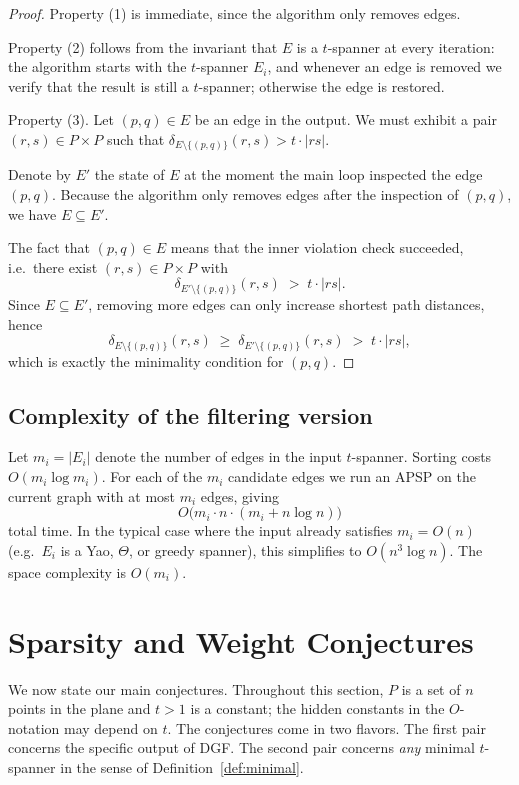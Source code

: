 \documentclass{article}
\begin{document}
\begin{proof}
Property (1) is immediate, since the algorithm only removes edges.

Property (2) follows from the invariant that $E$ is a $t$-spanner at
every iteration: the algorithm starts with the $t$-spanner $E_i$, and
whenever an edge is removed we verify that the result is still a
$t$-spanner; otherwise the edge is restored.

Property (3). Let $(p,q)\in E$ be an edge in the output. We must
exhibit a pair $(r,s)\in P\times P$ such that
$\delta_{E\setminus\{(p,q)\}}(r,s)>t\cdot|rs|$.

Denote by $E'$ the state of $E$ at the moment the main loop inspected
the edge $(p,q)$. Because the algorithm only removes edges after the
inspection of $(p,q)$, we have $E\subseteq E'$.

The fact that $(p,q)\in E$ means that the inner violation check
succeeded, i.e.\ there exist $(r,s)\in P\times P$ with
\[
   \delta_{E'\setminus\{(p,q)\}}(r,s) \;>\; t\cdot|rs|.
\]
Since $E\subseteq E'$, removing more edges can only increase shortest
path distances, hence
\[
   \delta_{E\setminus\{(p,q)\}}(r,s) \;\ge\;
   \delta_{E'\setminus\{(p,q)\}}(r,s) \;>\; t\cdot|rs|,
\]
which is exactly the minimality condition for $(p,q)$.
\end{proof}

\subsection{Complexity of the filtering version}
Let $m_i=|E_i|$ denote the number of edges in the input $t$-spanner.
Sorting costs $O(m_i\log m_i)$. For each of the $m_i$ candidate edges
we run an APSP on the current graph with at most $m_i$ edges, giving
\[
   O\bigl(m_i\cdot n\cdot(m_i+n\log n)\bigr)
\]
total time. In the typical case where the input already satisfies
$m_i=O(n)$ (e.g.\ $E_i$ is a Yao, $\Theta$, or greedy spanner), this
simplifies to $O(n^3 \log n)$. The space complexity is $O(m_i)$.

\section{Sparsity and Weight Conjectures}
\label{sec:conjectures}

We now state our main conjectures. Throughout this section, $P$ is a
set of $n$ points in the plane and $t>1$ is a constant; the hidden
constants in the $O$-notation may depend on $t$. The conjectures come
in two flavors. The first pair concerns the specific output of DGF.
The second pair concerns \emph{any} minimal $t$-spanner in the sense
of Definition~\ref{def:minimal}.
\end{document}
